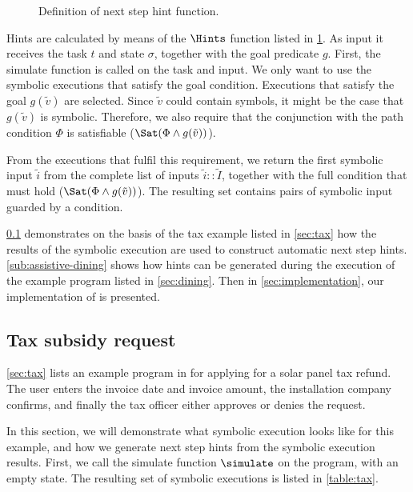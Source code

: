 \begin{figure}
  \caption{Definition of next step hint function.}
  \label{fig:hints}
\end{figure}


Hints are calculated by means of the $\Hints$ function listed in \cref{fig:hints}.
As input it receives the task $t$ and state $\sigma$, together with the goal predicate $g$.
First, the simulate function is called on the task and input.
We only want to use the symbolic executions that satisfy the goal condition.
Executions that satisfy the goal $g(\tilde{v})$ are selected.
Since $\tilde{v}$ could contain symbols, it might be the case that $g(\tilde{v})$ is symbolic.
Therefore, we also require that the conjunction with the path condition $\Phi$ is satisfiable ($\Sat(\Phi\land g(\tilde{v}))$).

From the executions that fulfil this requirement, we return the first symbolic input $\tilde{i}$ from the complete list of inputs $\tilde{i}::\tilde{I}$,
together with the full condition that must hold ($\Sat(\Phi\land g(\tilde{v}))$).
The resulting set contains pairs of symbolic input guarded by a condition.

\cref{sub:assistive-tax} demonstrates on the basis of the tax example listed in \cref{sec:tax} how the results of the symbolic execution are used to construct automatic next step hints.
\cref{sub:assistive-dining} shows how hints can be generated during the execution of the example \TOPHAT program listed in \cref{sec:dining}.
Then in \cref{sec:implementation}, our implementation of \ASTOPHAT is presented.


\subsection{Tax subsidy request}
\label{sub:assistive-tax}

\cref{sec:tax} lists an example program in \TOPHAT for applying for a solar panel tax refund.
The user enters the invoice date and invoice amount, the installation company confirms, and finally the tax officer either approves or denies the request.

In this section, we will demonstrate what symbolic execution looks like for this example, and how we generate next step hints from the symbolic execution results.
First, we call the simulate function $\simulate$ on the program, with an empty state.
The resulting set of symbolic executions is listed in \cref{table:tax}.

